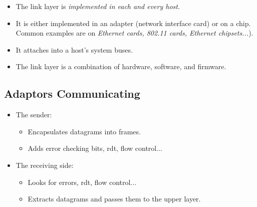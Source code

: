 \documentclass{article}
\begin{document}
\begin{itemize}
\item The link layer is \emph{implemented in each and every host}.
\item It is either implemented in an adapter (network interface card) or on a chip. Common examples are on \emph{Ethernet cards, 802.11 cards, Ethernet chipsets...}).
\item It attaches into a host's system buses.
\item The link layer is a combination of hardware, software, and firmware.
\end{itemize}

\subsection{Adaptors Communicating}

\begin{multicols}{2}
\begin{itemize}
\item The sender:
\begin{itemize}
\item Encapsulates datagrams into frames.
\item Adds error checking bits, rdt, flow control...
\end{itemize}

\vfill\null
\columnbreak

\item The receiving side:
\begin{itemize}
\item Looks for errors, rdt, flow control...
\item Extracts datagrams and passes them to the upper layer.
\end{itemize}
\end{itemize}
\end{multicols}
\end{document}
